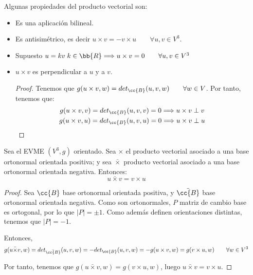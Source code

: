 Algunas propiedades del producto vectorial son:
\begin{itemize}
    \item Es una aplicación bilineal.
    \item Es antisimétrico, es decir $u\times v = -v\times u \qquad \forall u,v\in V^3$.
    \item Supuesto $u=kv \;k\in \bb{R}\Longrightarrow u\times v = 0 \qquad \forall u,v\in V^3$ 
    \item $u\times v$ es perpendicular a $u$ y a $v$.
    \begin{proof}
        Tenemos que $g(u\times v,w)=det_\cc{B} (u,v,w) \qquad \forall w\in V$. Por tanto, tenemos que:
        \begin{gather*}
            g(u\times v,v)=det_\cc{B} (u,v,v) = 0 \Longrightarrow u\times v \perp v\\
            g(u\times v,u)=det_\cc{B} (u,v,u) = 0 \Longrightarrow u\times v \perp u
        \end{gather*}
    \end{proof}
\end{itemize}


\begin{coro}
    Sea el EVME $(V^3,g)$ orientado. Sea $\times$ el producto vectorial asociado a una base ortonormal orientada positiva; y sea $\bar{\times}$ producto vectorial asociado a una base ortonormal orientada negativa. Entonces:
    \begin{equation*}
        u\bar{\times} v = v\times u
    \end{equation*}
\end{coro}

\begin{proof}
    Sea $\cc{B}$ base ortonormal orientada positiva, y $\bar{\cc{B}}$ base ortonormal orientada negativa. Como son ortonormales, $P$ matriz de cambio base es ortogonal, por lo que $|P|=\pm 1$. Como además definen orientaciones distintas, tenemos que $|P|={-1}$.
    
    
    Entonces,
    \begin{equation*}
        g(u\bar{\times}v, w) = det_{\bar{\cc{B}}}(u,v,w) = -det_{{\cc{B}}}(u,v,w) = -g(u\times v, w) = g(v\times u, w) \qquad \forall w\in V^3
    \end{equation*}

    Por tanto, tenemos que $g(u\bar{\times}v, w)=g(v{\times}u, w)$, luego $u\bar{\times} v = v\times u$.
\end{proof}


